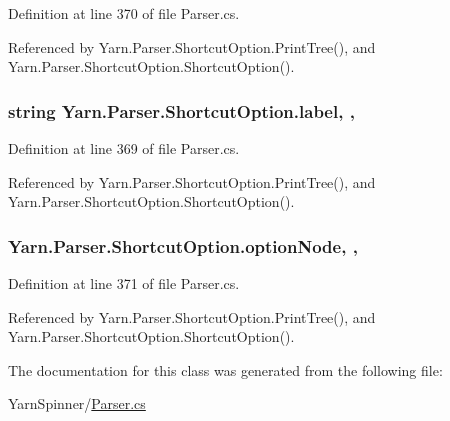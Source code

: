 Definition at line 370 of file Parser.\-cs.



Referenced by Yarn.\-Parser.\-Shortcut\-Option.\-Print\-Tree(), and Yarn.\-Parser.\-Shortcut\-Option.\-Shortcut\-Option().

\hypertarget{a00149_ab43ec731479a56891389f6ece87f5f62}{
\subsubsection[{label}]{\setlength{\rightskip}{0pt plus 5cm}string Yarn.\-Parser.\-Shortcut\-Option.\-label\hspace{0.3cm}{\ttfamily [get]}, {\ttfamily [set]}, {\ttfamily [package]}}}\label{a00149_ab43ec731479a56891389f6ece87f5f62}


Definition at line 369 of file Parser.\-cs.



Referenced by Yarn.\-Parser.\-Shortcut\-Option.\-Print\-Tree(), and Yarn.\-Parser.\-Shortcut\-Option.\-Shortcut\-Option().

\hypertarget{a00149_a33d667370031f58b054b79a39891c3f3}{
\subsubsection[{option\-Node}]{ Yarn.\-Parser.\-Shortcut\-Option.\-option\-Node\hspace{0.3cm}{\ttfamily [get]}, {\ttfamily [set]}, {\ttfamily [package]}}}\label{a00149_a33d667370031f58b054b79a39891c3f3}


Definition at line 371 of file Parser.\-cs.



Referenced by Yarn.\-Parser.\-Shortcut\-Option.\-Print\-Tree(), and Yarn.\-Parser.\-Shortcut\-Option.\-Shortcut\-Option().



The documentation for this class was generated from the following file\-:\begin{DoxyCompactItemize}
\item 
Yarn\-Spinner/\hyperlink{a00295}{Parser.\-cs}\end{DoxyCompactItemize}

